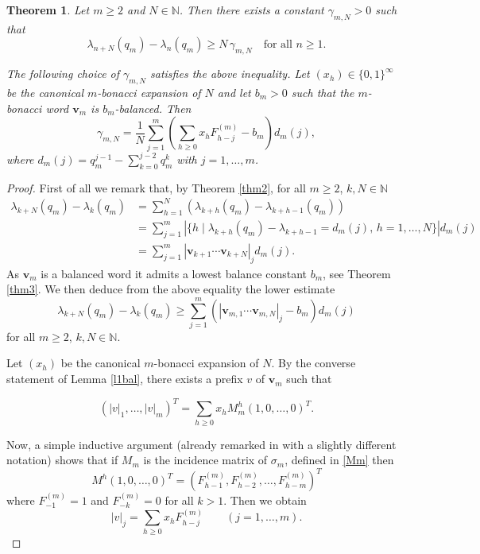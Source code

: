 \documentclass{amsart}
\newtheorem*{theorema}{Theorem}
\newcommand{\NN}{\mathbb N}
\begin{document}
\begin{theorema}
Let $m\geq 2$ and $N\in \mathbb{N}$. Then there exists a constant
$\gamma_{m,N}>0$ such that
\[
\lambda_{n+N}(q_m)-\lambda_n(q_m)\geq N\,\gamma_{m,N}
\quad \text{for all } n\geq 1.
\]

The following choice of $\gamma_{m,N}$ satisfies the above inequality.
Let $(x_h)\in\{0,1\}^\infty$ be the canonical $m$-bonacci expansion of $N$ and let $b_m>0$ such that the $m$-bonacci word $\mathbf v_m$ is $b_m$-balanced.
Then
\begin{equation}\label{eqgamma}
\gamma_{m,N}
=\frac{1}{N}
\sum_{j=1}^m
\left(
\sum_{h\geq 0} x_h F^{(m)}_{h-j}
- b_m
\right)
d_m(j),
\end{equation}
where
 $d_m(j)=q_m^{j-1}-\sum_{k=0}^{j-2} q_m^k$ with $j=1,\dots,m$.
\end{theorema}
\begin{proof}
First of all we remark that, by Theorem \ref{thm2},
for all $m\geq 2$, $k,N \in \NN$
\begin{align*}\label{gapw}
    \lambda_{k+N}(q_m)-\lambda_{k}(q_m)&=
    \sum_{h=1}^N(\lambda_{k+h}(q_m)-\lambda_{k+h-1}(q_m))\\
    &=\sum_{j=1}^m |\{h\mid \lambda_{k+h}(q_m)-\lambda_{k+h-1}=d_m(j),\,h=1,\dots,N\}|d_m(j)\\
    &=\sum_{j=1}^m |\mathbf v_{k+1}\cdots \mathbf v_{k+N}|_j d_m(j).
\end{align*}
As $\mathbf v_m$ is a balanced word it admits a lowest balance constant $b_m$, see Theorem \ref{thm3}. We then deduce from the above equality the lower estimate 
\begin{equation}\label{gapw}
    \lambda_{k+N}(q_m)-\lambda_{k}(q_m) \geq \sum_{j=1}^m\left(|\mathbf v_{m,1}\cdots \mathbf v_{m,N}|_j-b_m\right)d_m(j)\end{equation}
for all $m\geq 2$, $k,N \in \NN$. 


Let $(x_h)$ be the canonical $m$-bonacci expansion of $N$.
By the converse statement of Lemma \ref{l1bal}, there exists a
prefix $v$ of $\mathbf v_m$ such that

\[
(|v|_1,\dots,|v|_m)^T
=
\sum_{h\ge0}x_h M_m^h(1,0,\dots,0)^T .
\]

Now, a simple inductive argument (already remarked in \cite{generalbalance} with a slightly different notation) shows that if $M_m$ is the incidence matrix of $\sigma_m$, defined in \eqref{Mm} then
$$M^h(1,0,\dots,0)^T=(F^{(m)}_{h-1},F^{(m)}_{h-2},\dots, F^{(m)}_{h-m})^T$$
where $F^{(m)}_{-1}=1$ and $F^{(m)}_{-k}=0$ for all $k> 1$.
Then we obtain
\[
|v|_j
=
\sum_{h\ge0}x_hF_{h-j}^{(m)}
\qquad (j=1,\dots,m).
\]


\end{proof}
\end{document}
